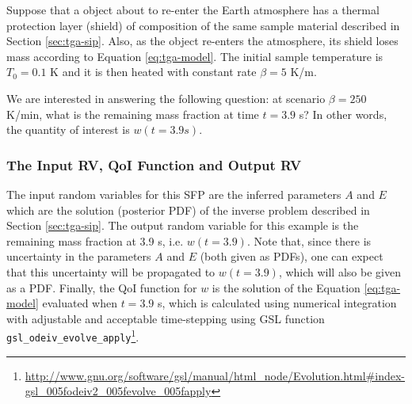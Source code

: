 Suppose that a object about to re-enter the Earth atmosphere has a thermal protection layer (shield) of composition of the same sample material described in Section \ref{sec:tga-sip}. Also, as the object re-enters the atmosphere, its shield loses mass according to Equation \eqref{eq:tga-model}.  The initial sample temperature is $T_0=0.1$ K and it is then heated with constant rate $\beta=5$ K/m.

We are interested in answering the following question: at scenario $\beta=250$ K/min, what is the remaining mass fraction at time $t=3.9$ s? In other words, the quantity of interest is $w(t=3.9s)$.




\subsubsection{The Input RV, QoI Function and Output RV}


The input random variables for this SFP are the inferred parameters $A$ and $E$ which are the solution (posterior PDF) of the inverse problem described in Section \ref{sec:tga-sip}. The output random variable for this example is the remaining mass fraction at 3.9 s, i.e. $w(t=3.9)$. Note that, since there is uncertainty in the parameters $A$ and $E$ (both given as PDFs), one can expect that this uncertainty will be propagated to $w(t=3.9)$, which will also be given as a PDF. Finally, the QoI function for $w$ is the solution of the Equation \eqref{eq:tga-model} evaluated when $t=3.9$ s, which is calculated using numerical integration with adjustable and acceptable time-stepping using GSL function \verb+gsl_odeiv_evolve_apply+\footnote{\url{http://www.gnu.org/software/gsl/manual/html_node/Evolution.html\#index-gsl_005fodeiv2_005fevolve_005fapply}}. 

